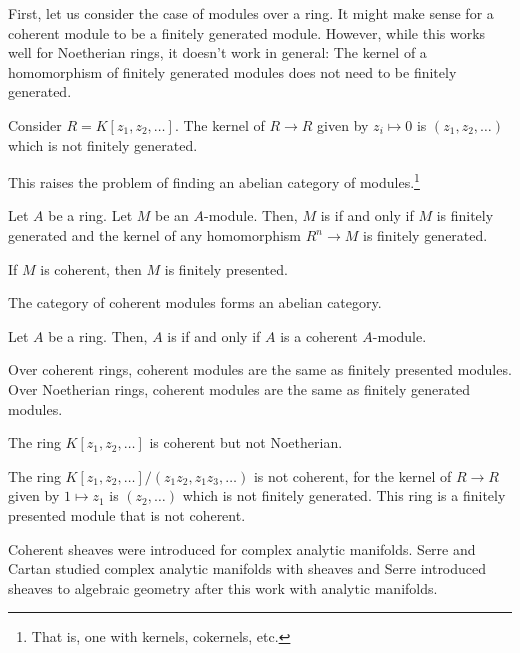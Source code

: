 \documentclass [11 pt, oneside] {article}
\begin{document}
First, let us consider the case of modules over a ring. It might make sense for a coherent module to be a finitely generated module. However, while this works well for Noetherian rings, it doesn't work in general: The kernel of a homomorphism of finitely generated modules does not need to be finitely generated.

\begin{example}[ ]\label{}\text{}
Consider $R = K[z_1,z_2,\hdots]$. The kernel of $R\longrightarrow R$ given by $z_i \longmapsto 0$ is $(z_1,z_2,\hdots)$ which is not finitely generated.
\end{example}

This raises the problem of finding an abelian category of modules.\footnote{That is, one with kernels, cokernels, etc.}

\begin{definition}[ ]\label{}\text{}
Let $A$ be a ring. Let $M$ be an $A$-module. Then, $M$ is  if and only if $M$ is finitely generated and the kernel of any homomorphism $R^n\longrightarrow M$ is finitely generated.
\end{definition}

\begin{remark}
	If $M$ is coherent, then $M$ is finitely presented.
\end{remark}

The category of coherent modules forms an abelian category.

 \begin{definition}[ ]\label{}\text{}
Let $A$ be a ring. Then, $A$ is  if and only if $A$ is a coherent $A$-module.
\end{definition}

Over coherent rings, coherent modules are the same as finitely presented modules. Over Noetherian rings, coherent modules are the same as finitely generated modules.

\begin{example}[ ]\label{}\text{}
The ring $K[z_1,z_2,\hdots]$ is coherent but not Noetherian. 

The ring $K[z_1,z_2,\hdots]/(z_1z_2,z_1z_3,\hdots)$ is not coherent, for the kernel of $R\longrightarrow R$ given by $1\longmapsto z_1$ is $(z_2,\hdots)$ which is not finitely generated. This ring is a finitely presented module that is not coherent.
\end{example}

Coherent sheaves were introduced for complex analytic manifolds. Serre and Cartan studied complex analytic manifolds with sheaves and Serre introduced sheaves to algebraic geometry after this work with analytic manifolds. 
\end{document}
